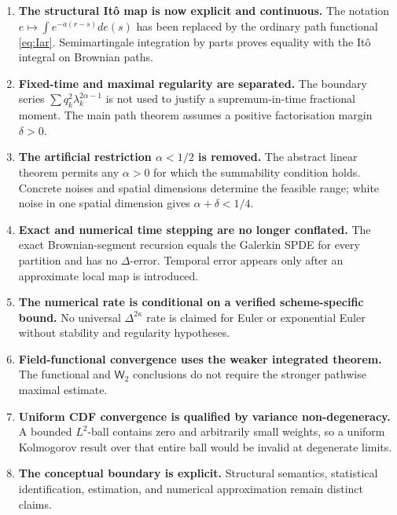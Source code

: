 \documentclass[11pt]{article}
\theoremstyle{remark}
\newcommand{\1}{\mathbf 1}
\begin{document}
\begin{enumerate}[leftmargin=2em]
\item \textbf{The structural It\^o map is now explicit and continuous.}
The notation \(e\mapsto\int e^{-a(r-s)}de(s)\) has been replaced by the ordinary path functional \eqref{eq:Iar}.  Semimartingale integration by parts proves equality with the It\^o integral on Brownian paths.

\item \textbf{Fixed-time and maximal regularity are separated.}
The boundary series \(\sum q_k^2\lambda_k^{2\alpha-1}\) is not used to justify a supremum-in-time fractional moment.  The main path theorem assumes a positive factorisation margin \(\delta>0\).

\item \textbf{The artificial restriction \(\alpha<1/2\) is removed.}
The abstract linear theorem permits any \(\alpha>0\) for which the summability condition holds.  Concrete noises and spatial dimensions determine the feasible range; white noise in one spatial dimension gives \(\alpha+\delta<1/4\).

\item \textbf{Exact and numerical time stepping are no longer conflated.}
The exact Brownian-segment recursion equals the Galerkin SPDE for every partition and has no \(\Delta\)-error.  Temporal error appears only after an approximate local map is introduced.

\item \textbf{The numerical rate is conditional on a verified scheme-specific bound.}
No universal \(\Delta^{2\kappa}\) rate is claimed for Euler or exponential Euler without stability and regularity hypotheses.

\item \textbf{Field-functional convergence uses the weaker integrated theorem.}
The functional and \(\mathsf W_2\) conclusions do not require the stronger pathwise maximal estimate.

\item \textbf{Uniform CDF convergence is qualified by variance non-degeneracy.}
A bounded \(L^2\)-ball contains zero and arbitrarily small weights, so a uniform Kolmogorov result over that entire ball would be invalid at degenerate limits.

\item \textbf{The conceptual boundary is explicit.}
Structural semantics, statistical identification, estimation, and numerical approximation remain distinct claims.
\end{enumerate}
\end{document}
